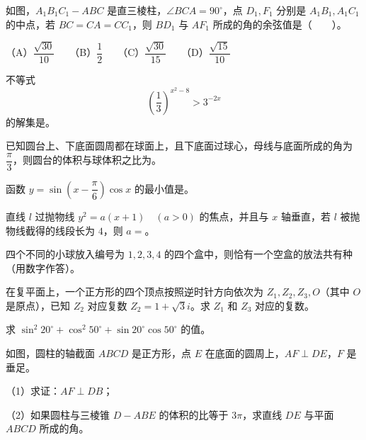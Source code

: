 \begin{question}
如图，$A_1B_1C_1-ABC$ 是直三棱柱，$\angle BCA=90^\circ$，点 $D_1,F_1$ 分别是 $A_1B_1,A_1C_1$ 的中点，若 $BC=CA=CC_1$，则 $BD_1$ 与 $AF_1$ 所成的角的余弦值是\mbox{（　　）}。
\nopagebreak[4]
\begin{center}\end{center}
\nopagebreak[4]
（A）$\dfrac{\sqrt{30}}{10}$　　（B）$\dfrac12$　　（C）$\dfrac{\sqrt{30}}{15}$　　（D）$\dfrac{\sqrt{15}}{10}$

\end{question}
\begin{question}
不等式
\nopagebreak[4]
\[
\left(\dfrac13\right)^{x^2-8}>3^{-2x}
\]
的解集是\underline{\qquad\qquad}。

\end{question}
\begin{question}
已知圆台上、下底面圆周都在球面上，且下底面过球心，母线与底面所成的角为 $\dfrac\pi3$，则圆台的体积与球体积之比为\underline{\qquad\qquad}。

\end{question}
\begin{question}
函数 $y=\sin\left(x-\dfrac\pi6\right)\cos x$ 的最小值是\underline{\qquad\qquad}。

\end{question}
\begin{question}
直线 $l$ 过抛物线 $y^2=a(x+1)\quad(a>0)$ 的焦点，并且与 $x$ 轴垂直，若 $l$ 被抛物线截得的线段长为 $4$，则 $a=$\underline{\qquad\qquad}。

\end{question}
\begin{question}
四个不同的小球放入编号为 $1,2,3,4$ 的四个盒中，则恰有一个空盒的放法共有\underline{\qquad\qquad}种（用数字作答）。

\end{question}
\begin{question}
在复平面上，一个正方形的四个顶点按照逆时针方向依次为 $Z_1,Z_2,Z_3,O$（其中 $O$ 是原点），已知 $Z_2$ 对应复数 $Z_2=1+\sqrt3i$。求 $Z_1$ 和 $Z_3$ 对应的复数。

\end{question}
\begin{question}
求 $\sin^2 20^\circ+\cos^2 50^\circ+\sin20^\circ\cos50^\circ$ 的值。

\Needspace{0.4\textheight}
\end{question}
\begin{question}
如图，圆柱的轴截面 $ABCD$ 是正方形，点 $E$ 在底面的圆周上，$AF\perp DE$，$F$ 是垂足。
\nopagebreak[4]
\begin{center}\end{center}
\nopagebreak[4]
（1）求证：$AF\perp DB$；

（2）如果圆柱与三棱锥 $D-ABE$ 的体积的比等于 $3\pi$，求直线 $DE$ 与平面 $ABCD$ 所成的角。

\end{question}
